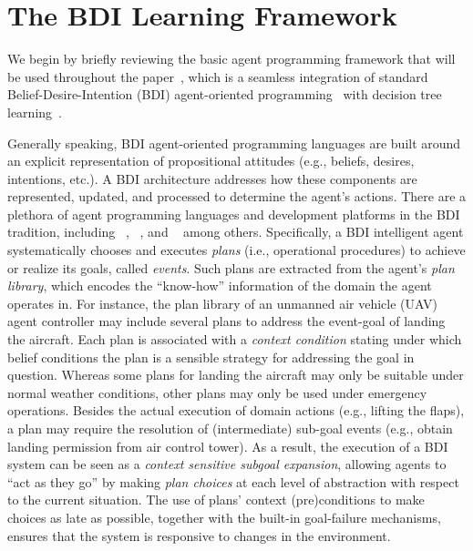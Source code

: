 \section{The BDI Learning Framework}\label{sec:framework}

We begin by briefly reviewing the basic agent programming framework that will be used throughout the paper~\cite{airiau09:enhancing,singh10:extending,singh10:learning}, which is a seamless integration of standard Belief-Desire-Intention (BDI) agent-oriented programming~\cite{Rao96:AgentSpeak,WooldridgeBook} with decision tree learning~\cite{Mitchell97:ML}. 

Generally speaking, BDI agent-oriented programming languages are built around an explicit representation of propositional attitudes (e.g., beliefs, desires, intentions, etc.). A BDI architecture addresses how these components are represented, updated, and processed to determine the agent's actions.
There are a plethora of agent programming languages and development platforms in the BDI tradition, including
\JACK~\cite{BusettaRHL:AL99-JACK}, 
\JADEX~\cite{Pokahr:EXP03-JADEX}, and
\JASON~\cite{jasonbook}
among others. 
Specifically, a BDI intelligent agent systematically chooses and executes \emph{plans} (i.e., operational procedures) to achieve or realize its goals, called \emph{events}.
Such plans are extracted from the agent's \emph{plan library}, which encodes the ``know-how'' information of the domain the agent operates in.
For instance, the plan library of an unmanned air vehicle (UAV) agent controller may include several plans to address the event-goal of landing the aircraft. Each plan is associated with a \emph{context condition} stating under which belief conditions the plan is a sensible strategy for addressing the goal in question. Whereas some plans for landing the aircraft may only be suitable under normal weather conditions, other plans may only be used under emergency operations.
Besides the actual execution of domain actions (e.g., lifting the flaps), a plan may require the resolution of (intermediate) sub-goal events (e.g., obtain landing permission from air control tower). As a result, the execution of a BDI system can be seen as a \textit{context sensitive subgoal expansion}, allowing agents to ``act as they go'' by making \emph{plan choices} at each level of abstraction with respect to the current situation. The use of plans' context (pre)conditions to make choices as late as possible, together with the built-in goal-failure mechanisms, ensures that the system is responsive to changes in the environment. 

